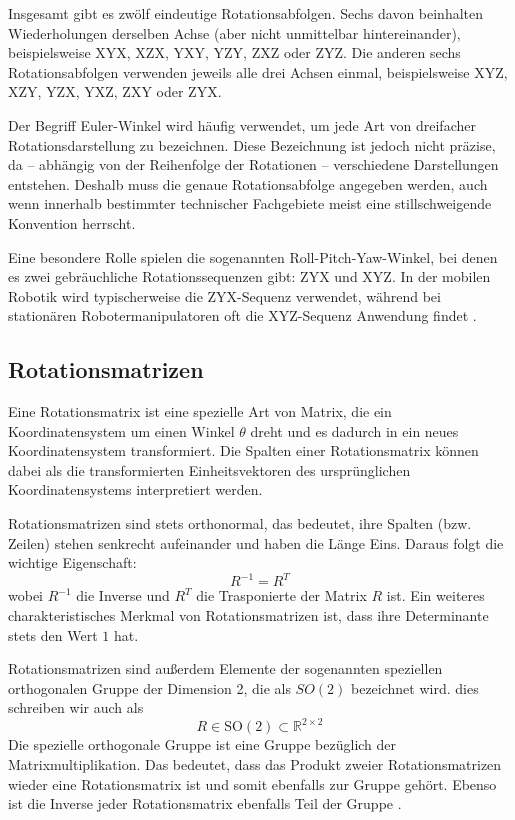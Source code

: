 Insgesamt gibt es zwölf eindeutige Rotationsabfolgen. Sechs davon beinhalten Wiederholungen derselben Achse (aber nicht unmittelbar hintereinander), beispielsweise XYX, XZX, YXY, YZY, ZXZ oder ZYZ. Die anderen sechs Rotationsabfolgen verwenden jeweils alle drei Achsen einmal, beispielsweise XYZ, XZY, YZX, YXZ, ZXY oder ZYX.

Der Begriff Euler-Winkel wird häufig verwendet, um jede Art von dreifacher Rotationsdarstellung zu bezeichnen. Diese Bezeichnung ist jedoch nicht präzise, da – abhängig von der Reihenfolge der Rotationen – verschiedene Darstellungen entstehen. Deshalb muss die genaue Rotationsabfolge angegeben werden, auch wenn innerhalb bestimmter technischer Fachgebiete meist eine stillschweigende Konvention herrscht.

Eine besondere Rolle spielen die sogenannten Roll-Pitch-Yaw-Winkel, bei denen es zwei gebräuchliche Rotationssequenzen gibt: ZYX und XYZ. In der mobilen Robotik wird typischerweise die ZYX-Sequenz verwendet, während bei stationären Robotermanipulatoren oft die XYZ-Sequenz Anwendung findet \cite[48-51]{Robotics_Vision_and_Control}.

\subsection{Rotationsmatrizen}
Eine Rotationsmatrix ist eine spezielle Art von Matrix, die ein Koordinatensystem um einen Winkel $\theta$ dreht und es dadurch in ein neues Koordinatensystem transformiert.
Die Spalten einer Rotationsmatrix können dabei als die transformierten Einheitsvektoren des ursprünglichen Koordinatensystems interpretiert werden.

Rotationsmatrizen sind stets orthonormal, das bedeutet, ihre Spalten (bzw. Zeilen) stehen senkrecht aufeinander und haben die Länge Eins.
Daraus folgt die wichtige Eigenschaft:
\[
 R^{-1}=R^T
 \]
wobei $R^{-1}$ die Inverse und $R^T$ die Trasponierte der Matrix $R$ ist.
Ein weiteres charakteristisches Merkmal von Rotationsmatrizen ist, dass ihre Determinante stets den Wert $1$ hat.

Rotationsmatrizen sind außerdem Elemente der sogenannten speziellen orthogonalen Gruppe der Dimension 2, die als $SO(2)$ bezeichnet wird. dies schreiben wir auch als
\[
    R \in \mathrm{SO}(2) \subset \mathbb{R}^{2 \times 2}
\]
Die spezielle orthogonale Gruppe ist eine Gruppe bezüglich der Matrixmultiplikation.
Das bedeutet, dass das Produkt zweier Rotationsmatrizen wieder eine Rotationsmatrix ist und somit ebenfalls zur Gruppe gehört.
Ebenso ist die Inverse jeder Rotationsmatrix ebenfalls Teil der Gruppe \cite[33]{Robotics_Vision_and_Control}.

